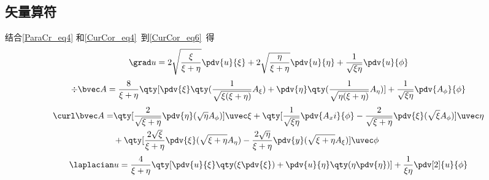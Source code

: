\subsection{矢量算符}
结合\autoref{ParaCr_eq4} 和\autoref{CurCor_eq4}~到\autoref{CurCor_eq6}~得
\begin{equation}
\grad u = 2\sqrt{\frac{\xi}{\xi + \eta}}\pdv{u}{\xi} + 2\sqrt{\frac{\eta}{\xi + \eta}}\pdv{u}{\eta} + \frac{1}{\sqrt{\xi\eta}}\pdv{u}{\phi}
\end{equation}
\begin{equation}
\div \bvec A = \frac{8}{\xi + \eta}\qty[\pdv{\xi}\qty(\frac{1}{\sqrt{\xi(\xi+\eta)}}A_\xi) + \pdv{\eta}\qty(\frac{1}{\sqrt{\eta(\xi+\eta)}}A_\eta)] + \frac{1}{\sqrt{\xi\eta}} \pdv{A_\phi}{\phi}
\end{equation}
\begin{equation}
\begin{aligned}
\curl \bvec A = &\qty[\frac{2}{\sqrt{\xi+\eta}}\pdv{\eta} (\sqrt{\eta}A_\phi)]\uvec \xi
+\qty[\frac{1}{\sqrt{\xi\eta}}\pdv{A_xi}{\phi} - \frac{2}{\sqrt{\xi+\eta}}\pdv{\xi}(\sqrt{\xi}A_\phi)]\uvec\eta\\
&+\qty[\frac{2\sqrt{\xi}}{\xi+\eta}\pdv{\xi}(\sqrt{\xi+\eta}A_\eta) - \frac{2\sqrt{\eta}}{\xi+\eta}\pdv{y}(\sqrt{\xi+\eta}A_\xi)]\uvec\phi
\end{aligned}
\end{equation}
\begin{equation}
\laplacian u = \frac{4}{\xi + \eta} \qty[\pdv{u}{\xi}\qty(\xi\pdv{\xi}) + \pdv{u}{\eta}\qty(\eta\pdv{\eta})] + \frac{1}{\xi\eta}\pdv[2]{u}{\phi}
\end{equation}
